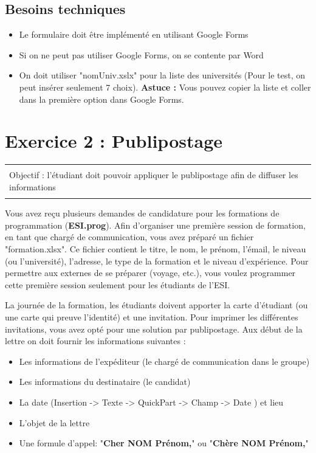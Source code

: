 \documentclass[11pt, a4paper]{article}
\begin{document}
\newpage
\subsection*{Besoins techniques}

\begin{multicols}{2}
\begin{itemize}
	\item Le formulaire doit être implémenté en utilisant Google Forms
	\item Si on ne peut pas utiliser Google Forms, on se contente par Word
	\item On doit utiliser "nomUniv.xslx" pour la liste des universités (Pour le test, on peut insérer seulement 7 choix). \textbf{Astuce :} Vous pouvez copier la liste et coller dans la première option dans Google Forms.
\end{itemize}
\end{multicols}

\section*{Exercice 2 : Publipostage}

\vspace{-12pt}
\begin{tabular}{|p{\textwidth}|}
	\hline\\
	Objectif : l'étudiant doit pouvoir appliquer le publipostage afin de diffuser les informations   \\\\
	\hline
\end{tabular}

Vous avez reçu plusieurs demandes de candidature pour les formations de programmation (\textbf{ESI.prog}). 
Afin d'organiser une première session de formation, en tant que chargé de communication, vous avez préparé un fichier "formation.xlsx". 
Ce fichier contient le titre, le nom, le prénom, l'émail, le niveau (ou l'université), l'adresse, le type de la formation et le niveau d'expérience. 
Pour permettre aux externes de se préparer (voyage, etc.), vous voulez programmer cette première session seulement pour les étudiants de l'ESI.

La journée de la formation, les étudiants doivent apporter la carte d'étudiant (ou une carte qui preuve l'identité) et une invitation. 
Pour imprimer les différentes invitations, vous avez opté pour une solution par publipostage. 
Aux début de la lettre on doit fournir les informations suivantes : 
\begin{multicols}{2}
\begin{itemize}
	\item Les informations de l'expéditeur (le chargé de communication dans le groupe)
	\item Les informations du destinataire (le candidat)
	\item La date (Insertion -> Texte -> QuickPart -> Champ -> Date ) et lieu
	\item L'objet de la lettre
	\item Une formule d'appel: "\textbf{Cher NOM Prénom,}" ou "\textbf{Chère NOM Prénom,}"
\end{itemize}
\end{multicols}
\end{document}
